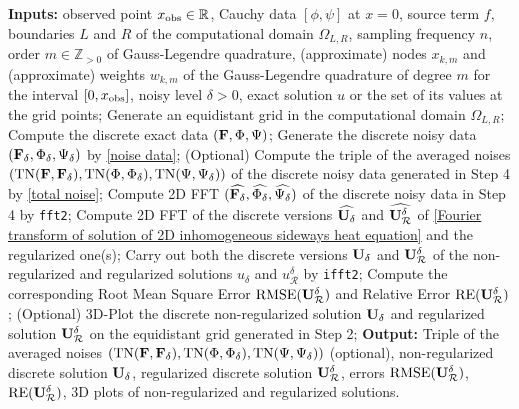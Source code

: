 \documentclass[oneside]{article}
\numberwithin{equation}{section}
\begin{document}
\begin{algorithm}[H]
    \caption{Numerical implementation of a regularization method proposed for \eqref{2D inhomogeneous sideways heat equation}.}
    \label{algorithm1}
    \begin{algorithmic}[1]
        \State \textbf{Inputs:} observed point $x_{\rm obs} \in\mathbb{R}$, Cauchy data $\left[\phi,\psi\right]$ at $x = 0$, source term $f$, boundaries $L$ and $R$ of the computational domain $\Omega _{L,R}$, sampling frequency $n$, order $m\in \mathbb{Z}_{> 0}$ of Gauss-Legendre quadrature, (approximate) nodes $x_{k,m}$ and (approximate) weights $w_{k,m}$ of the Gauss-Legendre quadrature of degree $m$ for the interval $[0,x_{\rm obs}]$, noisy level $\delta > 0$, exact solution $u$ or the set of its values at the grid points;
        \State Generate an equidistant grid in the computational domain $\Omega _{L,R}$; 
        \State Compute the discrete exact data $({\bf F},\Phi,\Psi)$;
        \State Generate the discrete noisy data $({\bf F}_\delta,\Phi_\delta,\Psi_\delta)$ by \eqref{noise data};
        \State (Optional) Compute the triple of the averaged noises $(\operatorname{TN}({\bf F},{\bf F}_\delta),\operatorname{TN}(\Phi,\Phi_\delta),\operatorname{TN}(\Psi,\Psi_\delta))$ of the discrete noisy data generated in Step 4 by \eqref{total noise}; 
        \State Compute 2D FFT $(\widehat{{\bf F}_\delta},\widehat{\Phi_\delta},\widehat{\Psi_\delta})$ of the discrete noisy data in Step 4 by \verb|fft2|;
        \State Compute 2D FFT of the discrete versions $\widehat{{\bf U}_\delta}$ and $\widehat{{\bf U}_\mathcal{R}^\delta}$ of \eqref{Fourier transform of solution of 2D inhomogeneous sideways heat equation} and the regularized one(s);
        \State Carry out both the discrete versions ${\bf U}_\delta$ and ${\bf U}_\mathcal{R}^\delta$ of the non-regularized and regularized solutions $u_\delta$ and $u_\mathcal{R}^\delta$ by \verb|ifft2|;
        \State Compute the corresponding Root Mean Square Error $\operatorname{RMSE}({\bf U}_\mathcal{R}^\delta)$ and Relative Error $\operatorname{RE}({\bf U}_\mathcal{R}^\delta)$;
        \State (Optional) 3D-Plot the discrete non-regularized solution ${\bf U}_\delta$ and regularized solution ${\bf U}_\mathcal{R}^\delta$ on the equidistant grid generated in Step 2;
        \State \textbf{Output:} Triple of the averaged noises $(\operatorname{TN}({\bf F},{\bf F}_\delta),\operatorname{TN}(\Phi,\Phi_\delta),\operatorname{TN}(\Psi,\Psi_\delta))$ (optional), non-regularized discrete solution ${\bf U}_\delta$, regularized discrete solution ${\bf U}_\mathcal{R}^\delta$, errors $\operatorname{RMSE}({\bf U}_\mathcal{R}^\delta)$, $\operatorname{RE}({\bf U}_\mathcal{R}^\delta)$, 3D plots of non-regularized and regularized solutions.
    \end{algorithmic}
\end{algorithm}
\end{document}
